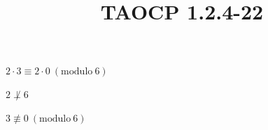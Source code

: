 \documentclass{article}
\title{TAOCP 1.2.4\mbox{-}22}
\begin{document}
\maketitle

\( 2 \cdot 3 \equiv 2 \cdot 0\ (\mathrm{modulo}\ 6) \)

\( 2 \not\perp 6 \)

\( 3 \not\equiv 0\ (\mathrm{modulo}\ 6) \)
\end{document}
